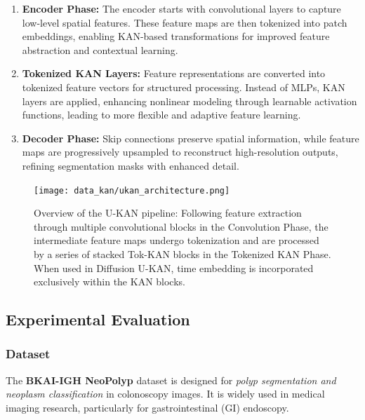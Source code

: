 \documentclass[conference]{IEEEtran}
\begin{document}
\setlength{\parskip}{0pt}
\begin{enumerate}[label=\arabic*.] %
    \item \textbf{Encoder Phase:} The encoder starts with convolutional layers to capture low-level spatial features. These feature maps are then tokenized into patch embeddings, enabling KAN-based transformations for improved feature abstraction and contextual learning.
    \item \textbf{Tokenized KAN Layers:} Feature representations are converted into tokenized feature vectors for structured processing. Instead of MLPs, KAN layers are applied, enhancing nonlinear modeling through learnable activation functions, leading to more flexible and adaptive feature learning.
    \item \textbf{Decoder Phase:}  Skip connections preserve spatial information, while feature maps are progressively upsampled to reconstruct high-resolution outputs, refining segmentation masks with enhanced detail.
\end{enumerate}

\begin{figure}[h!] %
    \centering %
    \texttt{[image: data\_kan/ukan\_architecture.png]} %
    \caption{Overview of the U-KAN pipeline: Following feature extraction through multiple convolutional blocks in the Convolution Phase, the intermediate feature maps undergo tokenization and are processed by a series of stacked Tok-KAN blocks in the Tokenized KAN Phase. When used in Diffusion U-KAN, time embedding is incorporated exclusively within the KAN blocks.} %
    \label{fig:example} %
\end{figure}

\subsection{Experimental Evaluation}

\subsubsection{Dataset}
The \textbf{BKAI-IGH NeoPolyp} dataset is designed for \textit{polyp
    segmentation and neoplasm classification} in colonoscopy images. It is widely
used in medical imaging research, particularly for gastrointestinal (GI)
endoscopy.
\end{document}
